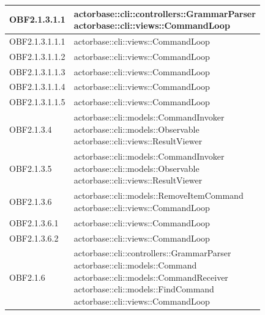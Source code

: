 \documentclass{scalatekids-article}
\begin{document}
\begin{longtable}[H]{|p{5cm}|p{12cm}|}
\hline
OBF2.1.3.1.1 & \multiLineCell[t]{actorbase::cli::controllers::GrammarParser\\actorbase::cli::views::CommandLoop\\}\\
\hline
OBF2.1.3.1.1.1 & \multiLineCell[t]{actorbase::cli::views::CommandLoop\\}\\
\hline
OBF2.1.3.1.1.2 & \multiLineCell[t]{actorbase::cli::views::CommandLoop\\}\\
\hline
OBF2.1.3.1.1.3 & \multiLineCell[t]{actorbase::cli::views::CommandLoop\\}\\
\hline
OBF2.1.3.1.1.4 & \multiLineCell[t]{actorbase::cli::views::CommandLoop\\}\\
\hline
OBF2.1.3.1.1.5 & \multiLineCell[t]{actorbase::cli::views::CommandLoop\\}\\
\hline
OBF2.1.3.4 & \multiLineCell[t]{actorbase::cli::models::CommandInvoker\\actorbase::cli::models::Observable\\actorbase::cli::views::ResultViewer\\}\\
\hline
OBF2.1.3.5 & \multiLineCell[t]{actorbase::cli::models::CommandInvoker\\actorbase::cli::models::Observable\\actorbase::cli::views::ResultViewer\\}\\
\hline
OBF2.1.3.6 & \multiLineCell[t]{actorbase::cli::models::RemoveItemCommand\\actorbase::cli::views::CommandLoop\\}\\
\hline
OBF2.1.3.6.1 & \multiLineCell[t]{actorbase::cli::views::CommandLoop\\}\\
\hline
OBF2.1.3.6.2 & \multiLineCell[t]{actorbase::cli::views::CommandLoop\\}\\
\hline
OBF2.1.6 & \multiLineCell[t]{actorbase::cli::controllers::GrammarParser\\actorbase::cli::models::Command\\actorbase::cli::models::CommandReceiver\\actorbase::cli::models::FindCommand\\actorbase::cli::views::CommandLoop\\}\\

\end{longtable}
\end{document}
